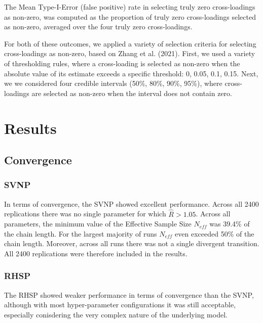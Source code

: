 \documentclass[
  man, donotrepeattitle,floatsintext]{apa6}
\begin{document}
The Mean Type-I-Error (false positive) rate in selecting truly zero cross-loadings as non-zero, was computed as the proportion of truly zero cross-loadings selected as non-zero, averaged over the four truly zero cross-loadings.

For both of these outcomes, we applied a variety of selection criteria for selecting cross-loadings as non-zero, based on Zhang et al. (2021). First, we used a variety of thresholding rules, where a cross-loading is selected as non-zero when the absolute value of its estimate exceeds a specific threshold: 0, 0.05, 0.1, 0.15. Next, we we considered four credible intervals (50\%, 80\%, 90\%, 95\%), where cross-loadings are selected as non-zero when the interval does not contain zero.

\hypertarget{results}{%
\section{Results}\label{results}}

\hypertarget{convergence}{%
\subsection{Convergence}\label{convergence}}

\hypertarget{svnp}{%
\subsubsection{SVNP}\label{svnp}}

In terms of convergence, the SVNP showed excellent performance. Across all 2400 replications there was no single parameter for which \(\hat{R} > 1.05\). Across all parameters, the minimum value of the Effective Sample Size \(N_{eff}\) was 39.4\% of the chain length. For the largest majority of runs \(N_{eff}\) even exceeded 50\% of the chain length. Moreover, across all runs there was not a single divergent transition. All 2400 replications were therefore included in the results.

\hypertarget{rhsp}{%
\subsubsection{RHSP}\label{rhsp}}

The RHSP showed weaker performance in terms of convergence than the SVNP, although with most hyper-parameter configurations it was still acceptable, especially conisdering the very complex nature of the underlying model.
\end{document}
